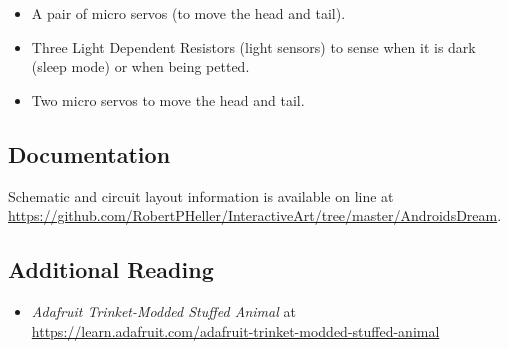 \begin{itemize}
\item A pair of micro servos (to move the head and tail).
\item Three Light Dependent Resistors (light sensors) to sense when it is dark
(sleep mode) or when being petted.
\item Two micro servos to move the head and tail.
\end{itemize}

\subsection*{Documentation}

Schematic and circuit layout information is available on line at 
\url{https://github.com/RobertPHeller/InteractiveArt/tree/master/AndroidsDream}.

\subsection*{Additional Reading}

\begin{itemize}
\item \textit{Adafruit Trinket-Modded Stuffed Animal} at 
\url{https://learn.adafruit.com/adafruit-trinket-modded-stuffed-animal} 
\end{itemize}

